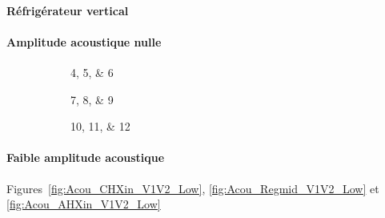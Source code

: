 %    

\paragraph{Réfrigérateur vertical}

\paragraph*{Amplitude acoustique nulle}
\begin{figure}[!ht]
    \centering
	\begin{subfigure}{\textwidth}
		\centering
		
		\caption{\numlist{4;5;6}}
		\label{fig:HeatOnly_CHXin_V1V2}
	\end{subfigure}	
	\begin{subfigure}{\textwidth}
		\centering
		
		\caption{\numlist{7;8;9}}
		\label{fig:HeatOnly_Regmid_V1V2}
	\end{subfigure}	
	\begin{subfigure}{\textwidth}
		\centering
		
		\caption{\numlist{10;11;12}}
		\label{fig:HeatOnly_AHXin_V1V2}
	\end{subfigure}		   
    \caption{}
    \label{fig:HeatOnly_V1V2}
\end{figure}

\paragraph*{Faible amplitude acoustique} Figures~\ref{fig:Acou_CHXin_V1V2_Low}, \ref{fig:Acou_Regmid_V1V2_Low} et \ref{fig:Acou_AHXin_V1V2_Low}

%    

